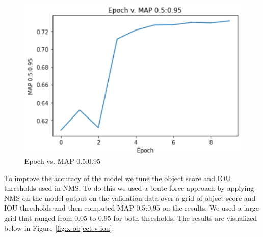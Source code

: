 \documentclass{article}
\begin{document}
\begin{figure}[h]
\centering
	\includegraphics[scale=0.7]{final-report-images/epoch_v_map.png}
\caption{Epoch vs. MAP 0.5:0.95}
\label{fig:x epoch_v_map}
\end{figure}

To improve the accuracy of the model we tune the object score and IOU thresholds used in NMS.  To do this we used a brute force approach by applying NMS on the model output on the validation data over a grid of object score and IOU thresholds and then computed MAP 0.5:0.95 on the results.  We used a large grid that ranged from 0.05 to 0.95 for both thresholds.  The results are visualized below in Figure \ref{fig:x object v iou}.  
\end{document}
